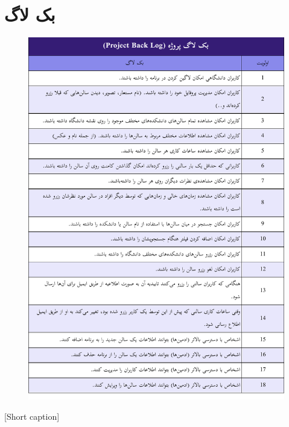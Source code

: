 \section{
بک لاگ 
}

\begin{center}
  \begin{figure} [h!]
    { \includegraphics[page=1, width=\textwidth]{appandecies/back_log.pdf}}
  \end{figure}
  [Short caption]{}
\end{center}
